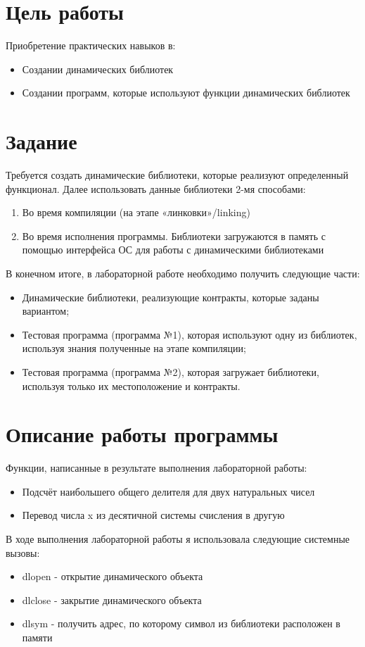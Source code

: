 \documentclass[a4paper, 12pt]{article}
\begin{document}
\section{Цель работы}
Приобретение практических навыков в:
\begin{itemize}
    \item Создании динамических библиотек
    \item Создании программ, которые используют функции динамических библиотек
\end{itemize}

\section{Задание}
Требуется создать динамические библиотеки, которые реализуют определенный функционал. Далее использовать данные библиотеки 2-мя способами:
\begin{enumerate}
    \item Во время компиляции (на этапе «линковки»/linking)
    \item Во время исполнения программы. Библиотеки загружаются в память с помощью интерфейса ОС для работы с динамическими библиотеками
\end{enumerate}
В конечном итоге, в лабораторной работе необходимо получить следующие части:
\begin{itemize}
    \item Динамические библиотеки, реализующие контракты, которые заданы вариантом;
    \item Тестовая программа (программа №1), которая используют одну из библиотек, используя знания полученные на этапе компиляции;
    \item Тестовая программа (программа №2), которая загружает библиотеки, используя только их местоположение и контракты.
\end{itemize}

\section{Описание работы программы}
Функции, написанные в результате выполнения лабораторной работы:
\begin{itemize}
    \item Подсчёт наибольшего общего делителя для двух натуральных чисел
    \item Перевод числа x из десятичной системы счисления в другую
\end{itemize}

В ходе выполнения лабораторной работы я использовала следующие системные вызовы:
\begin{itemize}
    \item dlopen - открытие динамического объекта
    \item dlclose - закрытие динамического объекта
    \item dlsym - получить адрес, по которому символ из библиотеки расположен в памяти
\end{itemize}
\end{document}
